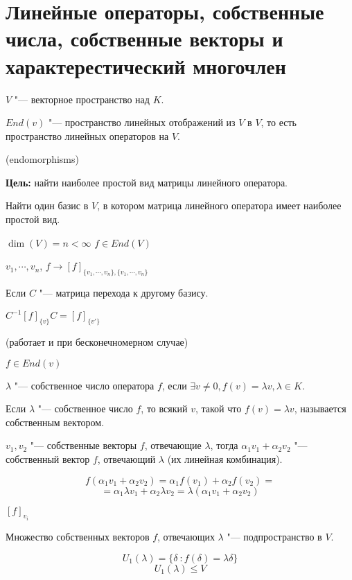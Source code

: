 \section{Линейные операторы, собственные числа, собственные векторы и 
характерестический многочлен}

$V$ "--- векторное пространство над $K$.

$End(v)$ "--- пространство линейных отображений из $V$ в $V$, 
то есть пространство линейных операторов на $V$.

(endomorphisms)

\textbf{Цель:} найти наиболее простой вид матрицы линейного оператора.

Найти один базис в $V$, в котором матрица линейного оператора имеет наиболее 
простой вид.

$\dim (V) = n < \infty$
$f \in End(V)$

$v_1, \cdots, v_n$, $f \to [f]_{\{v_1, \cdots, v_n\}, \{v_1, \cdots, v_n\}}$

Если $C$ "--- матрица перехода к другому базису. 

$C^{-1}[f]_{\{v\}}C = [f]_{\{v'\}}$

\begin{Def}
(работает и при бесконечномерном случае)

$f \in End(v)$

$\lambda$ "--- собственное число оператора $f$, если 
$\exists v \ne 0, f(v) = \lambda v, \lambda \in K$.
\end{Def}

\begin{Def}
   Если $\lambda$ "--- собственное число $f$, то всякий $v$, такой что $f(v) = \lambda v$, называется собственным
   вектором.
\end{Def}
\begin{Rem}
$v_1, v_2$ "--- собственные векторы $f$, отвечающие $\lambda$, тогда 
$\alpha_1 v_1 + \alpha_2 v_2$ "--- собственный вектор $f$, отвечающий $\lambda$
(их линейная комбинация).

$$f(\alpha_1 v_1 + \alpha_2 v_2) = \alpha_1 f(v_1) + \alpha_2 f(v_2) = $$
$$= \alpha_1 \lambda v_1 + \alpha_2 \lambda v_2 = \lambda(\alpha_1 v_1 + \alpha_2 v_2) $$

$[f]_{v_i}$
\end{Rem}

Множество собственных векторов $f$, отвечающих $\lambda$ "--- подпространство в $V$.

$$U_1(\lambda) = \{\delta\ \colon f(\delta) = \lambda \delta\} $$
$$U_1(\lambda) \le V$$

